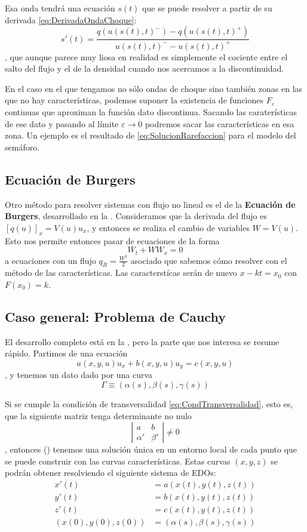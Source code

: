 Esa onda tendrá una ecuación $s(t)$ que se puede resolver a partir de su derivada \eqref{eq:DerivadaOndaChoque}: \[ s'(t) = \frac{q(u(s(t),t)^{-}) - q(u(s(t),t)^{+})}{u(s(t),t)^{-} - u(s(t),t)^{+}} \], que aunque parece muy liosa en realidad es simplemente el cociente entre el salto del flujo y el de la densidad cuando nos acercamos a la discontinuidad.

En el caso en el que tengamos no sólo ondas de choque sino también zonas en las que no hay características, podemos suponer la existencia de funciones $F_ε$ continuas que aproximan la función dato discontinua. Sacando las caraterísticas de ese dato y pasando al límite $ε \to 0$ podremos sacar las características en esa zona. Un ejemplo es el resultado de \eqref{eq:SolucionRarefaccion} para el modelo del semáforo.

\subsection{Ecuación de Burgers}

Otro método para resolver sistemas con flujo no lineal es el de la \textbf{Ecuación de Burgers}, desarrollado en la . Consideramos que la derivada del flujo es $[q(u)]_x = V(u)u_x$, y entonces se realiza el cambio de variables $W = V(u)$. Esto nos permite entonces pasar de ecuaciones de la forma \[ W_t + WW_x = 0 \] a ecuaciones con un flujo $q_B = \frac{W^2}{2}$ asociado que sabemos cómo resolver con el método de las características. Las caracterstícas serán de nuevo $x - kt = x_0$ con $F(x_0) = k$.

\subsection{Caso general: Problema de Cauchy}

El desarrollo completo está en la , pero la parte que nos interesa se resume rápido. Partimos de una ecuación \[ a(x,y,u) u_x + b(x,y,u) u_y = c(x,y,u) \], y tenemos un dato dado por una curva \[ Γ \equiv (α(s), β(s), γ(s)) \]

Si se cumple la condición de transversalidad \eqref{eq:CondTransversalidad}, esto es, que la siguiente matriz tenga determinante no nulo \[ \left|\begin{matrix} a & b \\ α' & β' \end{matrix}\right| ≠ 0 \],
entonces () tenemos una solución única en un entorno local de cada punto que se puede construir con las curvas características. Estas curvas $(x,y,z)$ se podrán obtener resolviendo el siguiente sistema de EDOs: \begin{align*}
 x'(t) &= a(x(t), y(t), z(t)) \\
 y'(t) &= b(x(t), y(t), z(t)) \\
 z'(t) &= c(x(t), y(t), z(t)) \\
 (x(0), y(0), z(0)) &= (α(s), β(s), γ(s))
\end{align*}


